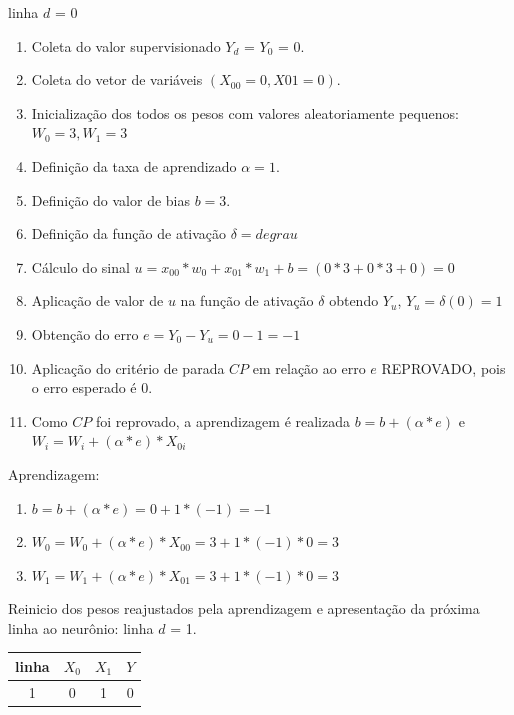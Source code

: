 \documentclass[	12pt, Times, openright, twoside, a4paper, english, brazil]{abntex2}
\begin{document}
  			 	 linha $d$ = 0
	  			 \begin{enumerate}
	  			    
	  			 	\item Coleta do valor supervisionado $Y_d$ = $Y_0$ = 0.
	  			 	\item Coleta do vetor de variáveis $(X_{00} = 0, X{01}=0)$.
	  			 	\item Inicialização dos todos os pesos com valores aleatoriamente pequenos: $W_0=3,W_1=3$
	  			 	\item Definição da taxa de aprendizado $\alpha = 1$.
	  			 	\item Definição do valor de bias $b=3$.
	  			 	\item Definição da função de ativação $\delta = degrau$  
	  			 	\item Cálculo do sinal $u = x_{00}*w_0 + x_{01}*w_1 +b = (0*3+0*3+0) = 0$
	  			 	\item Aplicação de valor de $u$ na função de ativação $\delta$ obtendo $Y_u$, $Y_u = \delta(0) = 1$
	  			 	\item Obtenção do erro $e = Y_0-Y_u = 0 - 1 = -1$
	  			 	\item Aplicação do critério de parada $CP$ em relação ao erro $e$ REPROVADO, pois o erro esperado é 0.
	  			 	\item Como $CP$ foi reprovado, a aprendizagem é realizada $b=b+(\alpha*e)$ e $W_i=W_i + (\alpha*e)*X_{0i}$
	  			 \end{enumerate}		
  				
    				Aprendizagem:
    				\begin{enumerate}
    					\item $b=b+(\alpha*e) = 0 + 1*(-1) = -1 $  					
    					\item $W_0=W_0 + (\alpha*e)*X_{00} = 3 + 1*(-1)*0 = 3$
    					\item $W_1=W_1 + (\alpha*e)*X_{01} = 3 + 1*(-1)*0 = 3$
    				\end{enumerate}	
    				
    				Reinicio dos pesos reajustados pela aprendizagem e apresentação da próxima linha ao neurônio:
    				linha $d$ = 1.\\
    				\begin{table}[!ht]
                    \centering
    				\begin{tabular}{|c|c|c|c|}
    					\hline  \textbf{linha} & \textbf{$X_0$} & \textbf{$X_1$} &  \textbf{$Y$}\\
  				 	    \hline 1 & 0 & 1 & 0\\
    				\end{tabular}
    				\end{table}
    				
\end{document}
